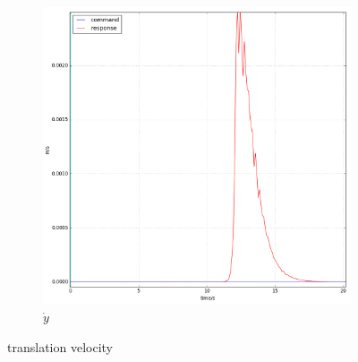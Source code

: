 \begin{figure}[!hb]
\begin{subfigure}[b]{0.49\textwidth}
         \includegraphics[width=1.2\textwidth]{Figures/PR_y.png}
         \caption{$\dot{y}$}
         \label{fig:PRtranslationY}
     \end{subfigure}
     
        \caption{translation velocity}
        \label{fig:PRtranslation}
\end{figure}
